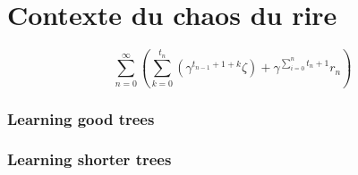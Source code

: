 \chapter{Contexte du chaos du rire}

$$\sum_{n=0}^{\infty}\left(\sum_{k=0}^{t_n}(\gamma^{t_{n-1} + 1 +k} \zeta) + \gamma^{\sum_{i=0}^n t_n + 1} r_n\right)$$

\subsection{Learning good trees}

\subsection{Learning shorter trees}

